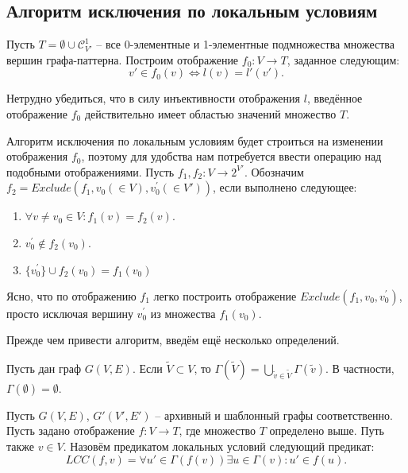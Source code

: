 \subsection{Алгоритм исключения по локальным условиям}

Пусть $T = \emptyset \cup \mathcal{C}_{V'}^1$ -- все 0-элементные и 1-элементные подмножества множества вершин графа-паттерна. Построим отображение $f_0 : V \to T$, заданное следующим:
\begin{equation}
v' \in f_0(v) \Leftrightarrow l(v) = l'(v').
\end{equation}

Нетрудно убедиться, что в силу инъективности отображения $l$, введённое отображение $f_0$ действительно имеет областью значений множество $T$.

Алгоритм исключения по локальным условиям будет строиться на изменении отображения $f_0$, поэтому для удобства нам потребуется ввести операцию над подобными отображениями. Пусть $f_1, f_2 : V \to 2^{V'}$. Обозначим $f_2 = Exclude(f_1, v_0 (\in V), v^{\prime}_0 (\in V'))$, если выполнено следующее:
\begin{enumerate}
	\item $\forall v \ne v_0 \in V: f_1(v) = f_2(v)$.
	\item $v^{\prime}_0 \notin f_2(v_0)$.
	\item $\{v^{\prime}_0\} \cup f_2(v_0) = f_1(v_0)$
\end{enumerate}

Ясно, что по отображению $f_1$ легко построить отображение $Exclude(f_1, v_0, v^{\prime}_0)$, просто исключая вершину $v^{\prime}_0$ из множества $f_1(v_0)$.

Прежде чем привести алгоритм, введём ещё несколько определений.

\begin{defn}
	Пусть дан граф $G(V, E)$. Если $\widetilde{V} \subset V$, то $\Gamma(\widetilde{V}) = \bigcup\limits_{\widetilde{v} \in \widetilde{V}} \Gamma(\widetilde{v})$. В частности, $\Gamma(\emptyset) = \emptyset$.
\end{defn} 

\begin{defn}
	Пусть $G(V, E)$, $G'(V', E')$ -- архивный и шаблонный графы соответственно. Пусть задано отображение $f : V \to T$, где множество $T$ определено выше. Путь также $v \in V$. Назовём предикатом локальных условий следующий предикат:
	\begin{equation}
		LCC(f, v) = \forall u' \in \Gamma(f(v)) \exists u \in \Gamma(v) : u' \in f(u).
	\end{equation} 
\end{defn} 


